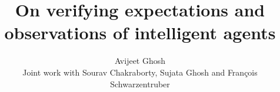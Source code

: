 \documentclass{beamer}
\title[On verifying expectations and observations of intelligent agents]{On verifying expectations and observations of intelligent agents}
\author[Avijeet Ghosh]{Avijeet Ghosh\\Joint work with Sourav Chakraborty, Sujata Ghosh and François Schwarzentruber}
\institute[ISI, Kolkata]{Indian Statistical Institute, Kolkata}
\date{}
\begin{document}
\begin{frame}
 \maketitle
\end{frame}



        
        
        
        


    
\end{document}
